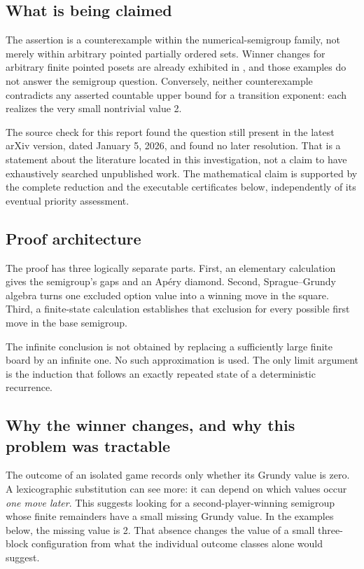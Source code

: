 \documentclass[11pt,letterpaper]{article}
\numberwithin{equation}{section}
\theoremstyle{definition}
\theoremstyle{remark}
\begin{document}
\subsection{What is being claimed}

The assertion is a counterexample within the numerical-semigroup family,
not merely within arbitrary pointed partially ordered sets. Winner changes
for arbitrary finite pointed posets are already exhibited in
\cite[Example 3.2]{RH26}, and those examples do not answer the semigroup
question. Conversely, neither counterexample contradicts any asserted
countable upper bound for a transition exponent: each realizes the very
small nontrivial value 2.

The source check for this report found the question still present in the
latest arXiv version, dated January 5, 2026, and found no later
resolution. That is a statement about the literature located in this
investigation, not a claim to have exhaustively searched unpublished work.
The mathematical claim is supported by the complete reduction and the
executable certificates below, independently of its eventual priority
assessment.

\subsection{Proof architecture}

The proof has three logically separate parts. First, an elementary
calculation gives the semigroup's gaps and an Ap\'ery diamond. Second,
Sprague--Grundy algebra turns one excluded option value into a winning
move in the square. Third, a finite-state calculation establishes that
exclusion for every possible first move in the base semigroup.

The infinite conclusion is not obtained by replacing a sufficiently large
finite board by an infinite one. No such approximation is used. The only
limit argument is the induction that follows an exactly repeated state of
a deterministic recurrence.

\subsection{Why the winner changes, and why this problem was tractable}

The outcome of an isolated game records only whether its Grundy value
is zero. A lexicographic substitution can see more: it can depend on
which values occur \emph{one move later}. This suggests looking for a
second-player-winning semigroup whose finite remainders have a small
missing Grundy value. In the examples below, the missing value is 2.
That absence changes the value of a small three-block configuration
from what the individual outcome classes alone would suggest.
\end{document}
